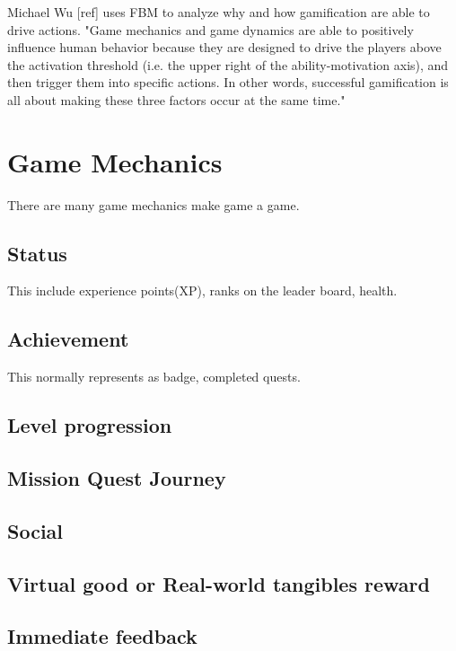 Michael Wu [ref] uses FBM to analyze why and how gamification are able to drive actions. 
"Game mechanics and game dynamics are able to positively influence human behavior because they are designed to drive the players above the activation threshold (i.e. the upper right of the ability-motivation axis), and then trigger them into specific actions. In other words, successful gamification is all about making these three factors occur at the same time."

\section{Game Mechanics}
There are many game mechanics make game a game. 

\subsection{Status}
This include experience points(XP), ranks on the leader board, health.

\subsection{Achievement}
This normally represents as badge, completed quests.

\subsection{Level progression}

\subsection{Mission Quest Journey}

\subsection{Social}

\subsection{Virtual good or Real-world tangibles reward}

\subsection{Immediate feedback}

